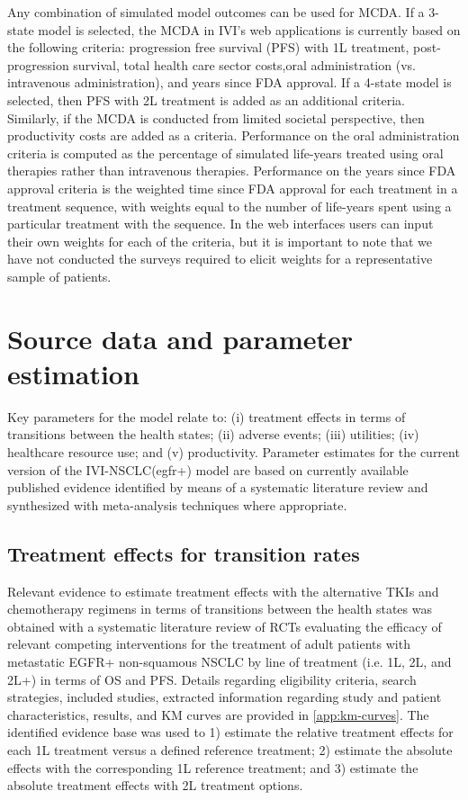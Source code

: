 \documentclass[11pt,final,fleqn]{article}\usepackage[]{graphicx}\usepackage[]{color}
\theoremstyle{plain}
\begin{document}
{Any combination of simulated model outcomes can be used for MCDA. If a 3-state model is selected, the MCDA in IVI's web applications is currently based on the following criteria: progression free survival (PFS) with 1L treatment, post-progression survival, total health care sector costs,oral administration (vs. intravenous administration), and years since FDA approval. If a 4-state model is selected, then PFS with 2L treatment is added as an additional criteria. Similarly, if the MCDA is conducted from limited societal perspective, then productivity costs are added as a criteria. Performance on the oral administration criteria is computed as the percentage of simulated life-years treated using oral therapies rather than intravenous therapies. Performance on the years since FDA approval criteria is the weighted time since FDA approval for each treatment in a treatment sequence, with weights equal to the number of life-years spent using a particular treatment with the sequence. In the web interfaces users can input their own weights for each of the criteria, but it is important to note that we have not conducted the surveys required to elicit weights for a representative sample of patients.

\section{Source data and parameter estimation}\label{sec:data}
Key parameters for the model relate to: (i) treatment effects in terms of transitions between the health states; (ii) adverse events; (iii) utilities; (iv) healthcare resource use; and (v) productivity. Parameter estimates for the current version of the IVI-NSCLC(egfr+) model are based on currently available published evidence identified by means of a systematic literature review and synthesized with meta-analysis techniques where appropriate. 

\subsection{Treatment effects for transition rates} \label{subsec:data-trans-rates}
Relevant evidence to estimate treatment effects with the alternative TKIs and chemotherapy regimens in terms of transitions between the health states was obtained with a systematic literature review of RCTs evaluating the efficacy of relevant competing interventions for the treatment of adult patients with metastatic EGFR+ non-squamous NSCLC by line of treatment (i.e. 1L, 2L, and 2L+) in terms of OS and PFS. Details regarding eligibility criteria, search strategies, included studies, extracted information regarding study and patient characteristics, results, and KM curves are provided in \autoref{app:km-curves}. 
The identified evidence base was used to 1) estimate the relative treatment effects for each 1L treatment versus a defined reference treatment; 2) estimate the absolute effects with the corresponding 1L reference treatment; and 3) estimate the absolute treatment effects with 2L treatment options. 

}
\end{document}
